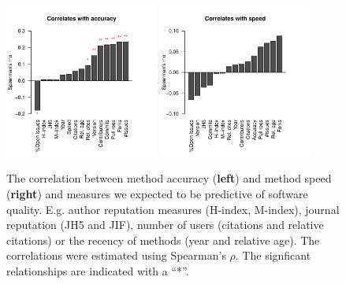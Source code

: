 \documentclass[fleqn,10pt]{SelfArx} %
\begin{document}
\begin{figure}[H]
\centering
\includegraphics[width=0.45\textwidth]{spearmanBarplot.pdf}
\includegraphics[width=0.45\textwidth]{spearmanBarplotSpeed.pdf}
\caption{The correlation between method accuracy ({\bf left}) and
  method speed ({\bf right}) and measures we expected to be
  predictive of software quality. E.g. author reputation measures
  (H-index, M-index), journal reputation (JH5 and JIF), number of
  users (citations and relative citations) or the recency of methods
  (year and relative age).  The correlations were estimated using
  Spearman's $\rho$. The signficant relationships are indicated with a
  ``*''. }
\label{fig:S2}
\end{figure}


\end{document}
